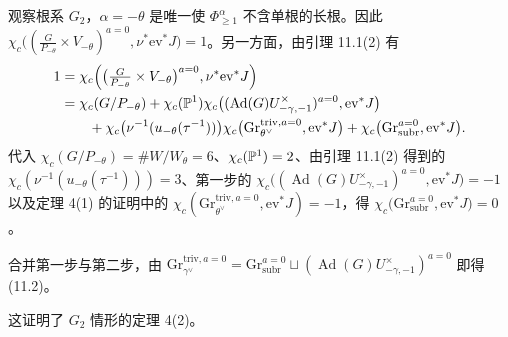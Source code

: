 观察根系 $G_2$，$\alpha=-\theta$ 是唯一使 $\Phi^\alpha_{\ge1}$ 不含单根的长根。因此 $\chi_c\bigl((\frac{G}{P_{-\theta}}\times V_{-\theta})^{a=0},\nu^*\mathrm{ev}^*J\bigr)=1$。另一方面，由引理 11.1(2) 有
\begin{align*}
1&=\chi_c\Bigl(\bigl(\tfrac{G}{P_{-\theta}}\times V_{-\theta}\bigr)^{a=0},\nu^*\mathrm{ev}^*J\Bigr)\\
&=\chi_c(G/P_{-\theta})+\chi_c(\mathbb{P}^1)\chi_c\bigl((\operatorname{Ad}(G)U^\times_{-\gamma,-1})^{a=0},\mathrm{ev}^*J\bigr)\\
&\qquad+\chi_c\bigl(\nu^{-1}(u_{-\theta}(\tau^{-1}))\bigr)\chi_c\bigl(\mathrm{Gr}^{\mathrm{triv},a=0}_{\theta^\vee},\mathrm{ev}^*J\bigr)
+\chi_c\bigl(\mathrm{Gr}^{a=0}_{\mathrm{subr}},\mathrm{ev}^*J\bigr).
\end{align*}
代入 $\chi_c(G/P_{-\theta})=\#W/W_\theta=6$、$\chi_c(\mathbb{P}^1)=2$、由引理 11.1(2) 得到的 $\chi_c(\nu^{-1}(u_{-\theta}(\tau^{-1})))=3$、第一步的 $\chi_c\bigl((\operatorname{Ad}(G)U^\times_{-\gamma,-1})^{a=0},\mathrm{ev}^*J\bigr)=-1$ 以及定理 4(1) 的证明中的 $\chi_c(\mathrm{Gr}^{\mathrm{triv},a=0}_{\theta^\vee},\mathrm{ev}^*J)=-1$，得 $\chi_c\bigl(\mathrm{Gr}^{a=0}_{\mathrm{subr}},\mathrm{ev}^*J\bigr)=0$。

合并第一步与第二步，由 $\mathrm{Gr}^{\mathrm{triv},a=0}_{\gamma^\vee}=\mathrm{Gr}^{a=0}_{\mathrm{subr}}\sqcup(\operatorname{Ad}(G)U^\times_{-\gamma,-1})^{a=0}$ 即得 (11.2)。

这证明了 $G_2$ 情形的定理 4(2)。
